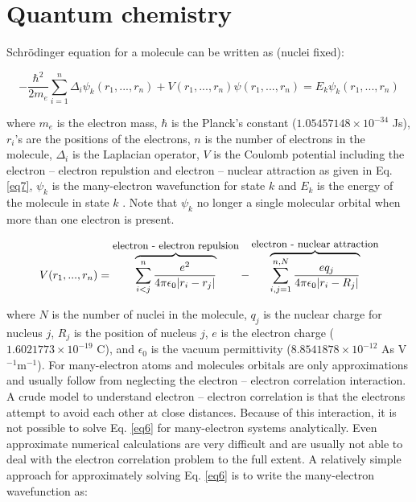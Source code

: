 \documentclass[byrevtex,amssymb,aps,pra,floatfix,letterpaper]{revtex4}
\begin{document}
\section{Quantum chemistry}

Schr\"odinger equation for a molecule can be written as (nuclei fixed):

\begin{equation}
\label{eq6}
-\frac{\hbar^2}{2m_e}\sum_{i=1}^{n}{\Delta_i\psi_k(r_1,...,r_n)}
+ V(r_1,...,r_n)\psi(r_1,...,r_n) = E_k\psi_k(r_1,...,r_n)
\end{equation}

\noindent
where $m_e$ is the electron mass, $\hbar$ is the Planck's constant ($1.05457148\times 10^{-34}$ Js), $r_i$'s are the positions of the electrons, $n$ is the number of electrons in the molecule, $\Delta_i$ is the Laplacian operator, $V$ is the Coulomb potential including the electron -- electron repulstion and electron -- nuclear attraction as given in Eq. \ref{eq7}, $\psi_k$ is the many-electron wavefunction for state $k$ and $E_k$ is the energy of the molecule in state $k$ \cite{SILBEY,ATKINS1,ATKINS2}. Note that $\psi_k$ no longer a single molecular orbital when more than one electron is present.

\begin{equation}
\label{eq7}
V(r_1,...,r_n) = 
\mathop {\overbrace{\sum_{i<j}^{n}{\frac{e^2}{4\pi \epsilon_0 |r_i - r_j|}}}}
\limits^{\textnormal{\small electron\ -\ electron\ repulsion}}
- \mathop {\overbrace{\sum_{i,j=1}^{n,N}{\frac{eq_j}{4\pi \epsilon_0 |r_i - R_j|}}}}^{\textnormal{\small electron\ -\ nuclear attraction}}
\end{equation}

\noindent
where $N$ is the number of nuclei in the molecule, $q_j$ is the nuclear charge for nucleus $j$, $R_j$ is the position of nucleus $j$, $e$ is the electron charge ($1.6021773 \times 10^{-19}$ C), and $\epsilon_0$ is the vacuum permittivity ($8.8541878 \times 10^{-12}$ As V$^{-1}$m$^{-1}$). For many-electron atoms and molecules orbitals are only approximations and usually follow from neglecting the electron -- electron correlation interaction. A crude model to understand electron -- electron correlation is that the electrons attempt to avoid each other at close distances. Because of this interaction, it is not possible to solve Eq. \ref{eq6} for many-electron systems analytically. Even approximate numerical calculations are very difficult and are usually not able to deal with the electron correlation problem to the full extent. A relatively simple approach for approximately solving Eq. \ref{eq6} is to write the many-electron wavefunction as:
\end{document}
